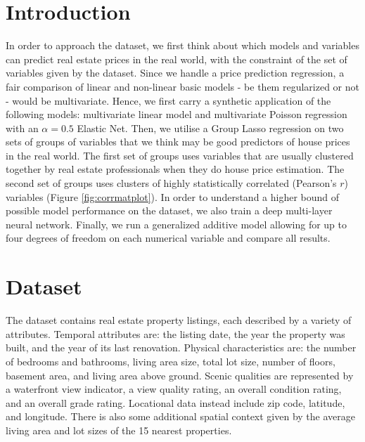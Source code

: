 \documentclass[a4paper, 11pt]{article}
\begin{document}
\begin{multicols}{2}

\section{Introduction} \vspace{-7pt}
In order to approach the dataset, we first think about which models and variables can predict real estate prices in the real world, with the constraint of the set of variables given by the dataset. Since we handle a price prediction regression, a fair comparison of linear and non-linear basic models - be them regularized or not - would be multivariate. Hence, we first carry a synthetic application of the following models: multivariate linear model and multivariate Poisson regression with an $\alpha = 0.5$ Elastic Net.
Then, we utilise a Group Lasso regression on two sets of groups of variables that we think may be good predictors of house prices in the real world. The first set of groups uses variables that are usually clustered together by real estate professionals when they do house price estimation. The second set of groups uses clusters of highly statistically correlated (Pearson's $r$) variables (Figure \ref{fig:corrmatplot}). In order to understand a higher bound of possible model performance on the dataset, we also train a deep multi-layer neural network. Finally, we run a generalized additive model allowing for up to four degrees of freedom on each numerical variable and compare all results.

\section{Dataset} \vspace{-7pt}
The dataset contains real estate property listings, each described by a variety of attributes. Temporal attributes are: the listing date, the year the property was built, and the year of its last renovation. Physical characteristics are: the number of bedrooms and bathrooms, living area size, total lot size, number of floors, basement area, and living area above ground. Scenic qualities are represented by a waterfront view indicator, a view quality rating, an overall condition rating, and an overall grade rating. Locational data instead include zip code, latitude, and longitude. There is also some additional spatial context given by the average living area and lot sizes of the 15 nearest properties.


\end{multicols}
\end{document}
